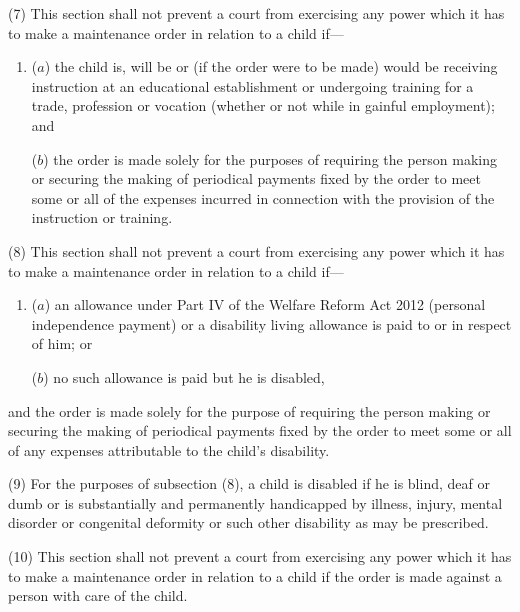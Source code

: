 \documentclass[12pt,a4paper]{article}
\begin{document}
(7) This section shall not prevent a court from exercising any power which it has to make a maintenance order in relation to a child if—
\begin{enumerate}\item[]
($a$) the child is, will be or (if the order were to be made) would be receiving instruction at an educational establishment or undergoing training for a trade, profession or vocation (whether or not while in gainful employment); and

($b$) the order is made solely for the purposes of requiring the person making or securing the making of periodical payments fixed by the order to meet some or all of the expenses incurred in connection with the provision of the instruction or training.
\end{enumerate}

(8) This section shall not prevent a court from exercising any power which it has to make a maintenance order in relation to a child if—
\begin{enumerate}\item[]
($a$) 
an allowance under Part IV of the Welfare Reform Act 2012 (personal independence payment) or  %
a disability living allowance is paid to or in respect of him; or

($b$) no such allowance is paid but he is disabled,
\end{enumerate}
and the order is made solely for the purpose of requiring the person making or securing the making of periodical payments fixed by the order to meet some or all of any expenses attributable to the child’s disability.

(9) For the purposes of subsection (8), a child is disabled if he is blind, deaf or dumb or is substantially and permanently handicapped by illness, injury, mental disorder or congenital deformity or such other disability as may be prescribed.

(10) This section shall not prevent a court from exercising any power which it has to make a maintenance order in relation to a child if the order is made against a person with care of the child.
\end{document}
